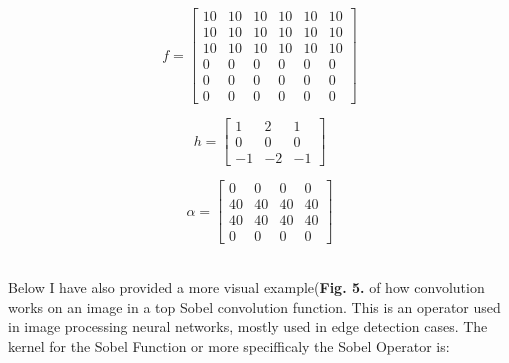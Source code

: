 \documentclass[9pt,onecolumn,oneside]{osajnl}
\begin{document}
\begin{figure}[h]
  \centering
   \begin{minipage}[b]{0.3\textwidth}
  \[f =\begin{bmatrix}
10 & 10 & 10 & 10 & 10 & 10\\
10 & 10 & 10 & 10 & 10 & 10\\
10 & 10 & 10 & 10 & 10 & 10\\
0 & 0 & 0 & 0 & 0 & 0\\
0 & 0 & 0 & 0 & 0 & 0\\
0 & 0 & 0 & 0 & 0 & 0
\end{bmatrix} \]
  \end{minipage}
  \hfill
  \begin{minipage}[b]{0.3\textwidth}
  \[h =\begin{bmatrix}
1 & 2 & 1\\
0 & 0 & 0 \\
-1 & -2 & -1
\end{bmatrix} \]
\end{minipage}
\hfill
\begin{minipage}[b]{0.3\textwidth}
  \[\alpha =\begin{bmatrix}
0 & 0 & 0 & 0\\
40 & 40 & 40 & 40 \\
40 & 40 & 40 & 40 \\
0 & 0 & 0 & 0
\end{bmatrix} \]
\end{minipage}
  \hfill
  
 \end{figure}\\


    
    Below I have also provided a more visual example(\textbf{Fig. 5.} of how convolution works on an image in a top Sobel convolution function. This is an operator used in image processing neural networks, mostly used in edge detection cases. The kernel for the Sobel Function or more specifficaly the Sobel Operator is:\\
    
\end{document}
